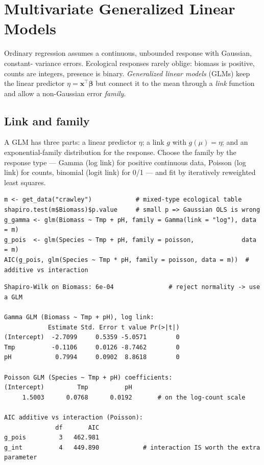 \documentclass[11pt,oneside]{book}
\begin{document}
\chapter{Multivariate Generalized Linear Models}
\label{ch:glm}
Ordinary regression assumes a continuous, unbounded response with Gaussian, constant-
variance errors. Ecological responses rarely oblige: biomass is positive, counts are
integers, presence is binary. \emph{Generalized linear models} (GLMs) keep the linear
predictor $\eta=\mathbf x^{\!\top}\boldsymbol\beta$ but connect it to the mean through a
\emph{link} function and allow a non-Gaussian error \emph{family}.

\section{Link and family}
A GLM has three parts: a linear predictor $\eta$; a link $g$ with $g(\mu)=\eta$; and an
exponential-family distribution for the response. Choose the family by the response type
— Gamma (log link) for positive continuous data, Poisson (log link) for counts, binomial
(logit link) for 0/1 — and fit by iteratively reweighted least squares.

\begin{lstlisting}
m <- get_data("crawley")            # mixed-type ecological table
shapiro.test(m$Biomass)$p.value     # small p => Gaussian OLS is wrong
g_gamma <- glm(Biomass ~ Tmp + pH, family = Gamma(link = "log"), data = m)
g_pois  <- glm(Species ~ Tmp + pH, family = poisson,             data = m)
AIC(g_pois, glm(Species ~ Tmp * pH, family = poisson, data = m))  # additive vs interaction
\end{lstlisting}

\begin{lstlisting}[style=rout]
Shapiro-Wilk on Biomass: 6e-04               # reject normality -> use a GLM

Gamma GLM (Biomass ~ Tmp + pH), log link:
            Estimate Std. Error t value Pr(>|t|)
(Intercept)  -2.7099     0.5359 -5.0571        0
Tmp          -0.1106     0.0126 -8.7462        0
pH            0.7994     0.0902  8.8618        0

Poisson GLM (Species ~ Tmp + pH) coefficients:
(Intercept)         Tmp          pH
     1.5003      0.0768      0.0192       # on the log-count scale

AIC additive vs interaction (Poisson):
              df       AIC
g_pois         3   462.981
g_int          4   449.890            # interaction IS worth the extra parameter
\end{lstlisting}
\end{document}
